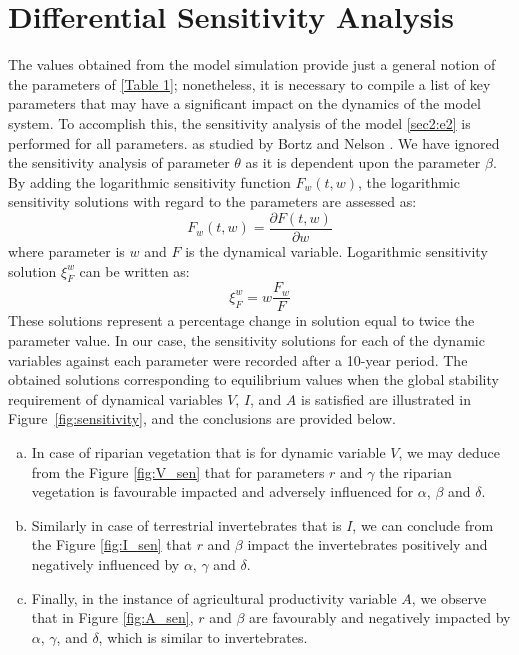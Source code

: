 \documentclass[12pt]{article}
\numberwithin{equation}{section}
\begin{document}
\section{Differential Sensitivity Analysis}
The values obtained from the model simulation provide just a general notion of the parameters of \autoref{Table 1}; nonetheless, it is necessary to compile a list of key parameters that may have a significant impact on the dynamics of the model system. To accomplish this, the sensitivity analysis of the model \eqref{sec2:e2} is performed for all parameters. as studied by Bortz and Nelson \cite{bortz2004}. We have ignored the sensitivity analysis of parameter $\theta$ as it is dependent upon the parameter $\beta$.\\
By adding the logarithmic sensitivity function $F_w(t,w)$, the logarithmic sensitivity solutions with regard to the parameters are assessed as:
\begin{equation}\label{sec5:e1}
F_w(t,w)=\frac{\partial F(t,w)}{\partial w}
\end{equation}
where parameter is $w$ and $F$ is the dynamical variable. Logarithmic sensitivity solution $\xi^w_F$ can be written as:
\begin{equation}\label{sec5:e2}
\xi^w_F=w\frac{F_w}{F}
\end{equation}
These solutions represent a percentage change in solution equal to twice the parameter value. In our case, the sensitivity solutions for each of the dynamic variables against each parameter were recorded after a 10-year period. The obtained solutions corresponding to equilibrium values when the global stability requirement of dynamical variables $V$, $I$, and $A$ is satisfied are illustrated in Figure~\ref{fig:sensitivity}, and the conclusions are provided below.
\begin{enumerate}[a)]
\item In case of riparian vegetation that is for dynamic variable $V$, we may deduce from the Figure \ref{fig:V_sen} that for parameters $r$ and $\gamma$ the riparian vegetation is favourable impacted and adversely influenced for $\alpha$, $\beta$ and $\delta$.
\item Similarly in case of terrestrial invertebrates that is $I$, we can conclude from the Figure \ref{fig:I_sen} that $r$ and $\beta$ impact the invertebrates positively and negatively influenced by $\alpha$, $\gamma$ and $\delta$.
\item Finally, in the instance of agricultural productivity variable $A$, we observe that in Figure \ref{fig:A_sen}, $r$ and $\beta$ are favourably and negatively impacted by $\alpha$, $\gamma$, and $\delta$, which is similar to invertebrates.
\end{enumerate}
\end{document}
